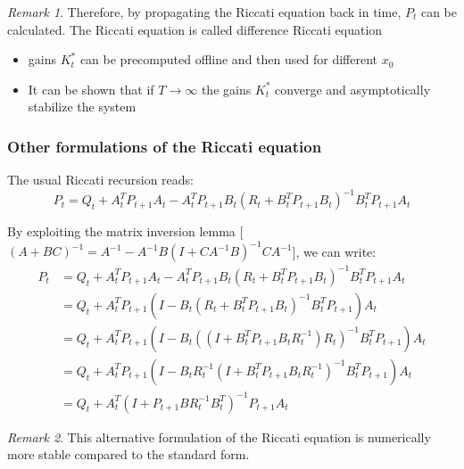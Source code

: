 \documentclass[openany]{book}
\theoremstyle{definition}
\theoremstyle{remark}
\newtheorem*{remark}{Remark}
\begin{document}
\begin{remark}
Therefore, by propagating the Riccati equation back in time, $P_t$ can be calculated. The Riccati equation is called difference Riccati equation
    \begin{itemize}
        \setlength{\itemsep}{0pt}
        \item gains $K_t^*$ can be precomputed offline and then used for different $x_0$ 
        \item It can be shown that if $T\to\infty$ the gains $K_t^*$ converge and asymptotically stabilize the system
    \end{itemize}
\end{remark}

\subsubsection{Other formulations of the Riccati equation}

The usual Riccati recursion reads:
\[
    P_t = Q_t + A_t^TP_{t+1}A_t - A_t^TP_{t+1}B_t(R_t + B_t^TP_{t+1}B_t)^{-1}B_t^TP_{t+1}A_t
\]

By exploiting the matrix inversion lemma [$(A+BC)^{-1} = A^{-1}-A^{-1}B(I+CA^{-1}B)^{-1}CA^{-1}$], we can write:
\begin{align*}
    P_t &= Q_t + A_t^TP_{t+1}A_t - A_t^TP_{t+1}B_t(R_t + B_t^TP_{t+1}B_t)^{-1}B_t^TP_{t+1}A_t\\
    &= Q_t + A_t^TP_{t+1}(I-B_t(R_t + B_t^TP_{t+1}B_t)^{-1}B_t^TP_{t+1})A_t\\
    &= Q_t + A_t^TP_{t+1}(I-B_t((I+B_t^TP_{t+1}B_tR_t^{-1})R_t)^{-1}B_t^TP_{t+1})A_t\\
    &= Q_t + A_t^TP_{t+1}(I-B_tR_t^{-1}(I+B_t^TP_{t+1}B_tR_t^{-1})^{-1}B_t^TP_{t+1})A_t\\
    &= Q_t + A_t^T(I+P_{t+1}BR_t^{-1}B_t^T)^{-1}P_{t+1}A_t
\end{align*}

\begin{remark}
This alternative formulation of the Riccati equation is numerically more stable compared to the standard form.
\end{remark}
\end{document}
